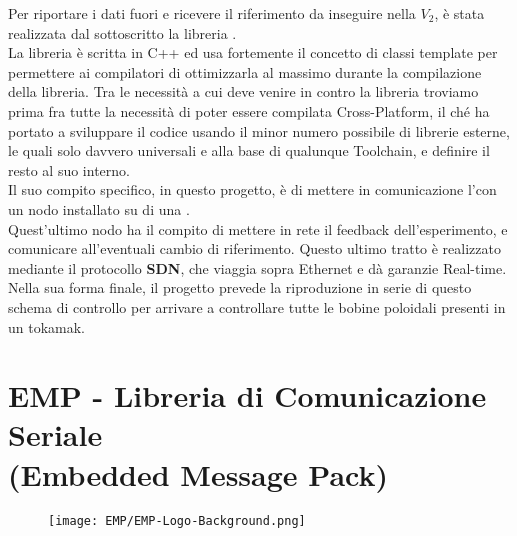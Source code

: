 \noindent
Per riportare i dati fuori e ricevere il riferimento da inseguire nella $V_2$, è stata realizzata dal sottoscritto la libreria \cite*{EMP}.\\
La libreria è scritta in C++ ed usa fortemente il concetto di classi template per permettere ai compilatori di ottimizzarla al massimo durante la compilazione della libreria. Tra le necessità a cui deve venire in contro la libreria troviamo prima fra tutte la necessità di poter essere compilata Cross-Platform, il ché ha portato a sviluppare il codice usando il minor numero possibile di librerie esterne, le quali solo davvero universali e alla base di qualunque Toolchain, e definire il resto al suo interno.\\
Il suo compito specifico, in questo progetto, è di mettere in comunicazione l'\ArduinoUno con un nodo \MARTe installato su di una \Rasp.\\
Quest'ultimo nodo ha il compito di mettere in rete il feedback dell'esperimento, e comunicare all'\ArduinoUno eventuali cambio di riferimento. Questo ultimo tratto è realizzato mediante il protocollo \textbf{SDN}, che viaggia sopra Ethernet e dà garanzie Real-time.\\
Nella sua forma finale, il progetto prevede la riproduzione in serie di questo schema di controllo per arrivare a controllare tutte le bobine poloidali presenti in un tokamak.

\newpage

\section*{EMP - Libreria di Comunicazione Seriale\\ (Embedded Message Pack)}\label{sec:EMP}
\vspace{-5mm}
\begin{figure}[H]
	\centering
	\texttt{[image: EMP/EMP-Logo-Background.png]}
\end{figure}\vspace{-10mm}
